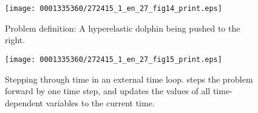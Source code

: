 \begin{figure}[!t]
\texttt{[image: 0001335360/272415\_1\_en\_27\_fig14\_print.eps]}
\caption{Problem definition: A hyperelastic dolphin being pushed to
  the right.}
\label{code:narayanan:fishyflow}\vspace*{-6pt}
\end{figure}

\begin{figure}[!t]
\texttt{[image: 0001335360/272415\_1\_en\_27\_fig15\_print.eps]}
\caption{Stepping through time in an external time loop. 
  steps the problem forward by one time step, and 
  updates the values of all time-dependent variables to the current time.}
\label{code:narayanan:manualstep}
\end{figure}

